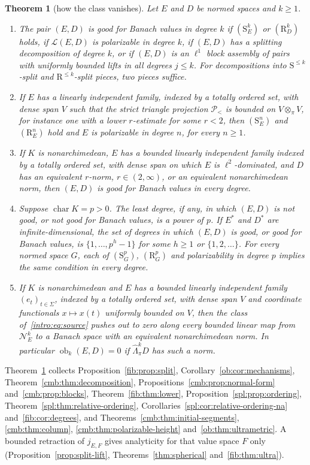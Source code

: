 \documentclass[11pt]{amsart}
\theoremstyle{definition}
\theoremstyle{remark}
\numberwithin{equation}{section}
\newcommand{\cL}{\mathcal L}
\theoremstyle{plain}
\newtheorem{introtheorem}{Theorem}
\theoremstyle{definition}
\theoremstyle{plain}
\newcommand{\ob}{\operatorname{ob}}
\newcommand{\cN}{\mathcal N}
\newcommand{\cP}{\mathcal P}
\begin{document}
\begin{introtheorem}[how the class vanishes]\label{intro:thm:C}
Let $E$ and $D$ be normed spaces and $k\ge1$.
\begin{enumerate}
\item The pair $(E,D)$ is good for Banach values in degree $k$ if $(\mathrm S^k_E)$ or $(\mathrm R^k_D)$ holds, if
$\cL(E,D)$ is polarizable in degree $k$, if $(E,D)$ has a splitting decomposition of degree $k$, or if $(E,D)$ is an
$\ell^1$ block assembly of pairs with uniformly bounded lifts in all degrees $j\le k$. For decompositions into
$\mathrm S^{\le k}$-split and $\mathrm R^{\le k}$-split pieces, two pieces suffice.
\item If $E$ has a linearly independent family, indexed by a totally ordered set, with dense span $V$ such that the
strict triangle projection $\cP_<$ is bounded on $V\otimes_\pi V$, for instance one with a lower $r$-estimate for some
$r<2$, then $(\mathrm S^n_E)$ and $(\mathrm R^n_E)$ hold and $E$ is polarizable in degree $n$, for every $n\ge1$.
\item If $K$ is nonarchimedean, $E$ has a bounded linearly independent family indexed by a totally ordered set, with
dense span on which $E$ is $\ell^2$-dominated, and $D$ has an equivalent $r$-norm, $r\in(2,\infty)$, or an
equivalent nonarchimedean norm, then $(E,D)$ is good for Banach values in every degree.
\item Suppose $\operatorname{char}K=p>0$. The least degree, if any, in which $(E,D)$ is not good, or not good for
Banach values, is a power of $p$. If $E^*$ and $D^*$ are infinite-dimensional, the set of degrees in which $(E,D)$ is
good, or good for Banach values, is $\{1,\dots,p^h-1\}$ for some $h\ge1$ or $\{1,2,\dots\}$. For every normed space
$G$, each of $(\mathrm S^p_G)$, $(\mathrm R^p_G)$ and polarizability in degree $p$ implies the same condition in every
degree.
\item If $K$ is nonarchimedean and $E$ has a bounded linearly independent family $(e_t)_{t\in\Sigma}$, indexed by a
totally ordered set, with dense span $V$ and coordinate functionals $x\mapsto x(t)$ uniformly bounded on $V$, then the
class of~\eqref{intro:eq:source} pushes out to zero along every bounded linear map from $\cN^k_E$ to a Banach space with
an equivalent nonarchimedean norm. In particular $\ob_k(E,D)=0$ if $\widehat\Lambda^k_\pi D$ has such a norm.
\end{enumerate}
\end{introtheorem}

Theorem~\ref{intro:thm:C} collects Proposition~\ref{fib:prop:split}, Corollary~\ref{ob:cor:mechanisms},
Theorem~\ref{cmb:thm:decomposition}, Propositions~\ref{cmb:prop:normal-form} and~\ref{cmb:prop:blocks},
Theorem~\ref{fib:thm:lower}, Proposition~\ref{spl:prop:ordering}, Theorem~\ref{spl:thm:relative-ordering},
Corollaries~\ref{spl:cor:relative-ordering-na} and~\ref{fib:cor:degrees}, and Theorems~\ref{cmb:thm:initial-segments},
\ref{cmb:thm:column}, \ref{cmb:thm:polarizable-height} and~\ref{ob:thm:ultrametric}. A bounded retraction of $j_{E,F}$
gives analyticity for that value space $F$ only (Proposition~\ref{prop:split-lift}, Theorems~\ref{thm:spherical}
and~\ref{fib:thm:ultra}).
\end{document}
